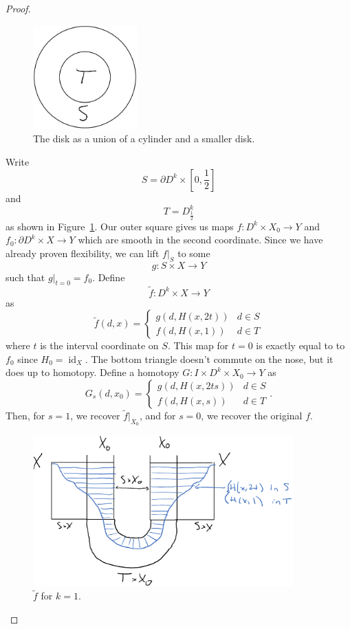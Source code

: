 \documentclass{article}
\newtheorem{proposed work}[theorem]{Proposed Work}
\DeclareMathOperator{\id}{id}
\begin{document}
\begin{proof}
\begin{figure}[h]
  \centering
  \includegraphics[width=4cm]{disk_s_t}
    \caption{The disk as a union of a cylinder and a smaller disk.\label{fig:disk_s_t}}
\end{figure}
Write 
\[
S = \partial D^k\times \left[0,\frac12\right]
\]
and
\[
T = D^k_{\tfrac12} 
\]
as shown in Figure~\ref{fig:disk_s_t}.
Our outer square gives us maps $f: D^k\times X_0\to Y$ and $f_0: \partial D^k\times X\to Y$ which are smooth in the second coordinate. Since we have already proven flexibility, we can lift $f|_S$ to some
\[
  g: S\times X \to Y
\]
such that $g|_{t=0}=f_0$. Define
\[
  \tilde f: D^k\times X\to Y
\]
as 
\[
  \tilde f(d, x) =
  \begin{cases}
    g(d, H(x,2t)) & d\in S\\
    f(d, H(x,1)) & d\in T
  \end{cases}
\]
where $t$ is the interval coordinate on $S$.
This map for $t=0$ is exactly equal to to $f_0$ since $H_0 = \id_X$. The bottom triangle doesn't commute on the nose, but it does up to homotopy. Define a homotopy $G: I\times D^k\times X_0 \to Y$ as
\[
G_s(d,x_0) =   \begin{cases}
    g(d, H(x,2ts)) & d\in S\\
    f(d, H(x,s)) & d\in T
  \end{cases}.
\]
Then, for $s=1$, we recover $\tilde f|_{X_0}$, and for $s=0$, we recover the original $f$.
\begin{figure}[h]
  \centering
  \includegraphics[width=10cm]{htpy_invariant}
  \caption{$\tilde f$ for $k=1$.}
\end{figure}
\end{proof}
\end{document}
